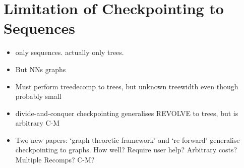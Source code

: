 \section{Limitation of Checkpointing to Sequences}
\begin{itemize}[topsep=0.2em]
    \item only sequences. actually only trees.
    \item But NNs graphs
    \item Must perform treedecomp to trees, but unknown treewidth even though probably small
    \item divide-and-conquer checkpointing generalises REVOLVE to trees, but is arbitrary C-M
    \item Two new papers: `graph theoretic framework' and `re-forward' generalise checkpointing to graphs. How well? Require user help? Arbitrary costs? Multiple Recomps? C-M?
\end{itemize}